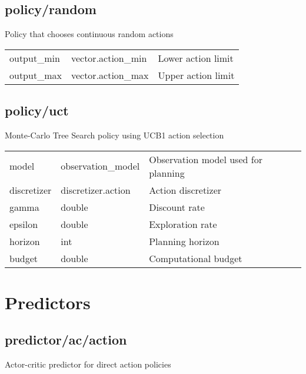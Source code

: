 \subsection{policy/random}
\noindent Policy that chooses continuous random actions\\

\noindent\begin{tabular}{@{}lll@{}}
output\_min&vector.action\_min&Lower action limit\\
output\_max&vector.action\_max&Upper action limit\\
\end{tabular}
\subsection{policy/uct}
\noindent Monte-Carlo Tree Search policy using UCB1 action selection\\

\noindent\begin{tabular}{@{}lll@{}}
model&observation\_model&Observation model used for planning\\
discretizer&discretizer.action&Action discretizer\\
gamma&double&Discount rate\\
epsilon&double&Exploration rate\\
horizon&int&Planning horizon\\
budget&double&Computational budget\\
\end{tabular}
\section{Predictors}
\subsection{predictor/ac/action}
\noindent Actor-critic predictor for direct action policies\\

